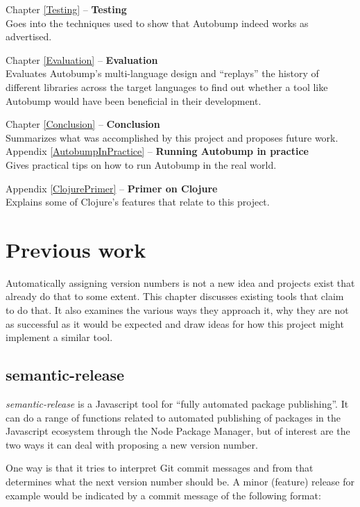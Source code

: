 \documentclass{l4proj}
\begin{document}
\noindent Chapter \ref{Testing} -- \textbf{Testing} \\
Goes into the techniques used to show that Autobump indeed works
as advertised.

\noindent Chapter \ref{Evaluation} -- \textbf{Evaluation} \\
Evaluates Autobump's multi-language design and ``replays'' the history
of different libraries across the target languages to find out whether
a tool like Autobump would have been beneficial in their development.

\noindent Chapter \ref{Conclusion} -- \textbf{Conclusion} \\
Summarizes what was accomplished by this project and proposes future work.
\\

\noindent Appendix \ref{AutobumpInPractice} -- \textbf{Running
Autobump in practice} \\
Gives practical tips on how to run Autobump in the real world.

\noindent Appendix \ref{ClojurePrimer} -- \textbf{Primer on Clojure}
\\
Explains some of Clojure's features that relate to this project.

\chapter{Previous work}
\label{PreviousWork}

Automatically assigning version numbers is not a new idea and projects
exist that already do that to some extent.
This chapter discusses existing tools that claim to do that. It also
examines the various ways they approach it, why they are not as
successful as it would be expected and draw ideas for how this project
might implement a similar tool.

\section{semantic-release}

\textit{semantic-release} \cite{SemanticRelease} is a Javascript tool
for ``fully automated package publishing''. It can do a range of
functions related to automated publishing of packages in the
Javascript ecosystem through the Node Package Manager, but of interest
are the two ways it can deal with proposing a new version number.

One way is that it tries to interpret Git commit messages and from
that determines what the next version number should be. A minor
(feature) release for example would be indicated by a commit message
of the following format:
\end{document}
